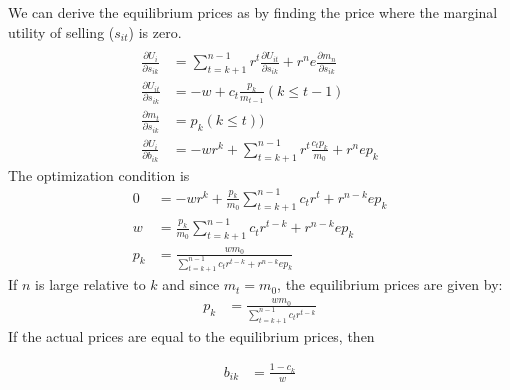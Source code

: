 \documentclass[14pt]{article} \usepackage{amsmath}
\begin{document}
We can derive the equilibrium prices as by finding the price where the marginal utility of selling ($s_{it}$) is zero. 
\begin{align} 
	\\\frac{ \partial U_i}{\partial s_{ik}} &= \sum\limits_{t=k +1}^{n-1} r^t \frac{\partial U_{it}}{\partial s_{ik}} + r^n e \frac{\partial m_n}{\partial s_{ik}} 
	\\\frac{\partial U_{it}}{\partial s_{ik}} &= -w + c_t \frac{p_k}{m_{t-1}} (k \leq t-1) 
	\\\frac{\partial m_t}{\partial s_{ik}} &= p_k(k \leq t)) 
	\\\frac{\partial U_i}{\partial b_{ik}} &= -w r^k + \sum\limits_{t=k+1}^{n-1} r^t\frac{c_t p_k}{m_0} + r^n e p_k 
\end{align}
The optimization condition is
\begin{align}
	0 &= -w r^k + \frac{ p_k}{m_0}\sum\limits_{t=k+1}^{n-1}c_t r^t + r^{n-k} e p_k 
	\\w &= \frac{ p_k}{m_0}\sum\limits_{t=k+1}^{n-1} c_tr^{t-k}  + r^{n -k}e p_k 
	\\ p_k&= \frac{w m_0 } {\sum\limits_{t=k+1}^{n-1} c_tr^{t-k}  + r^{n -k} e p_k }
\end{align}
If $n$ is large relative to $k$ and since $m_t = m_0$, the equilibrium prices are given by:
\begin{align} 
	 p_k&= \frac{w m_0 } {\sum\limits_{t=k+1}^{n-1} c_tr^{t-k}}
\end{align}
If the actual prices are equal to the equilibrium prices, then 

\begin{align} 
	 b_{ik} &= \frac{1 - c_k } {w}
\end{align}
\end{document}
